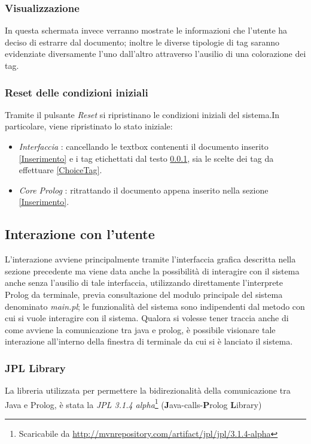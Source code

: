     \subsubsection{Visualizzazione}
    \label{Visualization}
    In questa schermata invece verranno mostrate le informazioni che l'utente ha deciso di estrarre dal documento; inoltre le diverse tipologie di tag saranno evidenziate diversamente l'uno dall'altro attraverso l'ausilio di una colorazione dei tag. 

    \subsubsection{Reset delle condizioni iniziali}
    Tramite il pulsante \emph{Reset} si ripristinano le condizioni iniziali del sistema.In particolare, viene ripristinato lo stato iniziale:
    \begin{itemize}
      \item \emph{Interfaccia} : cancellando le textbox contenenti il documento inserito \ref{Inserimento} e i tag etichettati dal testo \ref{Visualization}, sia le scelte dei tag da effettuare \ref{ChoiceTag}.
      \item \emph{Core Prolog} : ritrattando il documento appena inserito nella sezione \ref{Inserimento}.
    \end{itemize}
    
\subsection{Interazione con l’utente} %
L’interazione avviene principalmente tramite l'interfaccia grafica descritta nella sezione precedente ma viene data anche la possibilità di interagire con il sistema anche senza l'ausilio di tale interfaccia, utilizzando direttamente l'interprete Prolog da terminale, previa consultazione del modulo principale del sistema denominato \emph{main.pl}; le funzionalità del sistema sono indipendenti dal metodo con cui si vuole interagire con il  sistema. Qualora si volesse tener traccia anche di come avviene la comunicazione tra java e prolog, è possibile visionare tale interazione all'interno della finestra di terminale da cui si è lanciato il sistema.

\subsubsection{JPL Library}
La libreria utilizzata per permettere la bidirezionalità della comunicazione tra Java e Prolog, è stata la \emph{JPL 3.1.4 alpha}\footnote{Scaricabile da \url{http://mvnrepository.com/artifact/jpl/jpl/3.1.4-alpha}} (\textbf{J}ava-calls-\textbf{P}rolog \textbf{L}ibrary)

